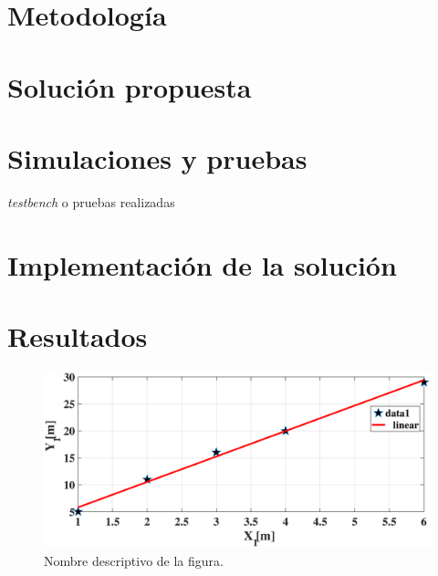 \documentclass[journal]{IEEEtran}
\begin{document}
\section{Metodología}	




\section{Solución propuesta}



\section{Simulaciones y pruebas}
\emph{testbench} o pruebas realizadas



\section{Implementación de la solución}



\section{Resultados}

\begin{figure}[H] %
  \centering  %
  \includegraphics[scale=0.23]{fig} %
  \caption{Nombre descriptivo de la figura.} %
  \label{lvdt4} %
  \end{figure}
  
\end{document}
